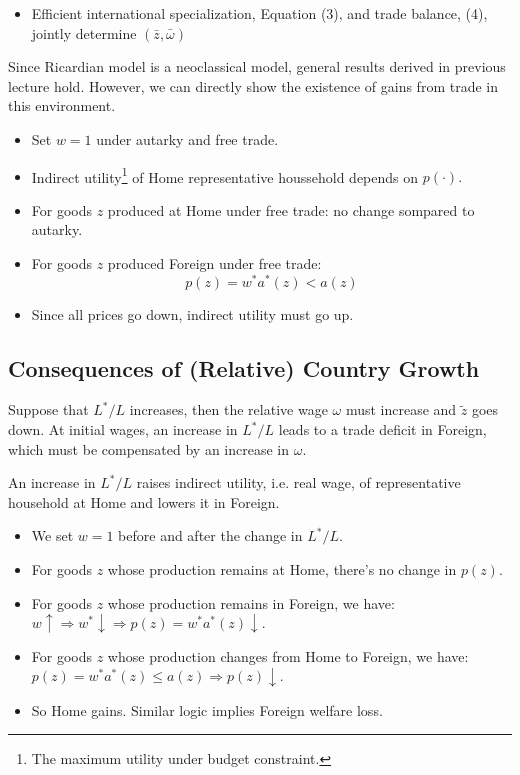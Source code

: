 \begin{itemize}
    \item Efficient international specialization, Equation (3), and trade balance, (4), jointly determine $(\bar{z}, \bar{\omega})$
\end{itemize}

Since Ricardian model is a neoclassical model, general results derived
in previous lecture hold. However, we can directly show the existence of gains from trade in this environment.

\begin{itemize}
    \item Set $w=1$ under autarky and free trade.
    \item Indirect utility\footnote{The maximum utility under budget constraint.} of Home representative houssehold depends on $p(\cdot).$
    \item For goods $z$ produced at Home under free trade: no change sompared to autarky.
    \item For goods $z$ produced Foreign under free trade:
    \[p(z) = w^* a^*(z) < a(z)\]
    \item Since all prices go down, indirect utility must go up.
\end{itemize}

\subsection{Consequences of (Relative) Country Growth}

Suppose that $L^*/L$ increases, then the relative wage $\omega$ must increase and $\tilde{z}$ goes down.
At initial wages, an increase in $L^*/L$ leads to a trade deficit in Foreign, which must be compensated by an increase in $\omega$.

An increase in $L^*/L$ raises indirect utility, i.e. real wage, of representative household at Home and lowers it in Foreign.

\begin{itemize}
    \item We set $w=1$ before and after the change in $L^*/L.$
    \item For goods $z$ whose production remains at Home, there's no change in $p(z)$.
    \item For goods $z$ whose production remains in Foreign, we have: $w \uparrow \Rightarrow w^* \downarrow \Rightarrow p(z) = w^* a^*(z) \downarrow.$
    \item For goods $z$ whose production changes from Home to Foreign, we have: $p(z) = w^* a^*(z) \leq a(z) \Rightarrow p(z) \downarrow.$
    \item So Home gains. Similar logic implies Foreign welfare loss.
\end{itemize}

